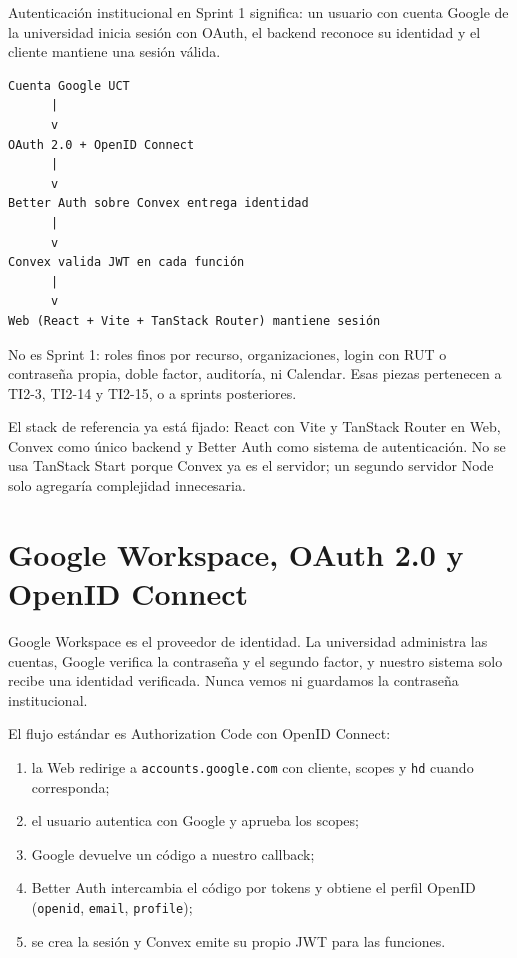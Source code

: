 \documentclass[11pt,a4paper]{article}
\begin{document}
Autenticación institucional en Sprint 1 significa: un usuario con cuenta
Google de la universidad inicia sesión con OAuth, el backend reconoce su
identidad y el cliente mantiene una sesión válida.

\begin{lstlisting}
Cuenta Google UCT
      |
      v
OAuth 2.0 + OpenID Connect
      |
      v
Better Auth sobre Convex entrega identidad
      |
      v
Convex valida JWT en cada función
      |
      v
Web (React + Vite + TanStack Router) mantiene sesión
\end{lstlisting}

No es Sprint 1: roles finos por recurso, organizaciones, login con RUT o
contraseña propia, doble factor, auditoría, ni Calendar. Esas piezas
pertenecen a TI2-3, TI2-14 y TI2-15, o a sprints posteriores.

El stack de referencia ya está fijado: React con Vite y TanStack Router en
Web, Convex como único backend y Better Auth como sistema de autenticación.
No se usa TanStack Start porque Convex ya es el servidor; un segundo servidor
Node solo agregaría complejidad innecesaria.

\section{Google Workspace, OAuth 2.0 y OpenID Connect}

Google Workspace es el proveedor de identidad. La universidad administra las
cuentas, Google verifica la contraseña y el segundo factor, y nuestro sistema
solo recibe una identidad verificada. Nunca vemos ni guardamos la contraseña
institucional.

El flujo estándar es Authorization Code con OpenID Connect:

\begin{enumerate}
  \item la Web redirige a \texttt{accounts.google.com} con cliente, scopes y
    \texttt{hd} cuando corresponda;
  \item el usuario autentica con Google y aprueba los scopes;
  \item Google devuelve un código a nuestro callback;
  \item Better Auth intercambia el código por tokens y obtiene el perfil
    OpenID (\texttt{openid}, \texttt{email}, \texttt{profile});
  \item se crea la sesión y Convex emite su propio JWT para las funciones.
\end{enumerate}
\end{document}

